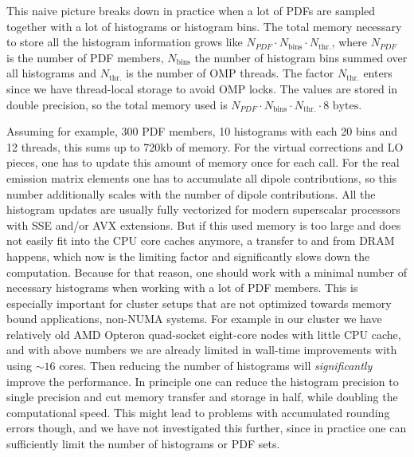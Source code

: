 This naive picture breaks down in practice when a lot of PDFs
are sampled together with a lot of histograms or histogram bins. The total memory necessary
to store all the histogram information grows like $N_{PDF} \cdot N_{\text{bins}} \cdot N_{\text{thr.}}$,
where $N_{PDF}$ is the number of PDF members, $N_{\text{bins}}$ the number of histogram bins
summed over all histograms and $N_{\text{thr.}}$ is the number of OMP threads. The factor $N_{\text{thr.}}$
enters since we have thread-local storage to avoid OMP locks.
The values are stored in double precision, so the total memory used is
$N_{PDF} \cdot N_{\text{bins}} \cdot N_{\text{thr.}} \cdot 8 \text{ bytes}$.

 Assuming for example, 300 PDF members,
10 histograms with each 20 bins and 12 threads, this sums up to {720}{kb} of memory. For the
virtual corrections and LO pieces, one has to update this amount of memory once for each call. For the real
emission matrix elements one has to accumulate all dipole contributions, so this number additionally scales
with the number of dipole contributions. All the histogram updates are usually fully vectorized for modern 
superscalar processors with SSE and/or AVX extensions. But if this used memory is too large and does not easily fit 
into the 
CPU core caches anymore, a transfer to and from DRAM happens, which now is the limiting factor and significantly slows
down the computation. Because for that reason, one should work with a minimal number of necessary histograms when 
working
with a lot of PDF members. This is especially important for cluster setups that are not optimized towards
memory bound applications, non-NUMA systems. For example in our cluster we have relatively old AMD Opteron quad-socket 
eight-core nodes with little CPU cache, and with above numbers we are already limited in wall-time improvements with 
using $\sim16$ cores. Then reducing 
the number of histograms will \emph{significantly} improve the performance. In principle one can reduce the histogram 
precision to single precision and cut memory transfer and storage in half, while doubling the computational speed. This 
might lead to problems with accumulated rounding errors though, and we have not investigated this further, since in
practice one can sufficiently limit the number of histograms or PDF sets.
